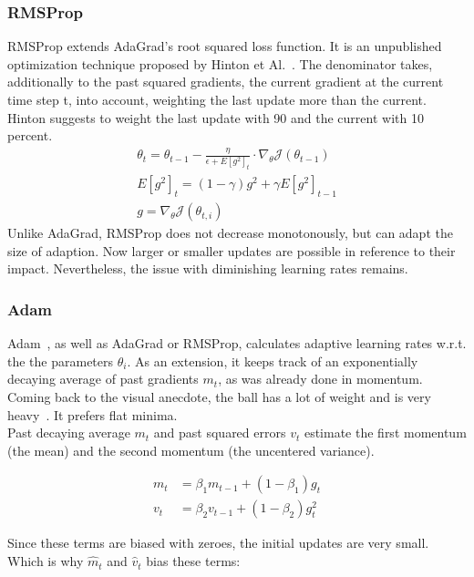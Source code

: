 \subsubsection{\gls{RMSProp}}
\gls{RMSProp} extends \gls{AdaGrad}'s root squared loss function.
It is an unpublished optimization technique proposed by Hinton et Al.~\cite{rmsprop}.
The denominator takes, additionally to the past squared gradients, the current gradient at the current time step t,
into account, weighting the last update more than the current.
Hinton suggests to weight the last update with 90 and the current with 10 percent.
\begin{align}
    \theta_{t} = \theta_{t-1} - \frac{\eta}{\epsilon+E[g^2]_t} \cdot \nabla_\theta\mathcal{J}(\theta_{t-1})\label{eqn:rmsprop:1}\\
    E[g^2]_t = (1-\gamma)g^2+\gamma E[g^2]_{t-1}\label{eqn:rmsprop:2}\\
    g = \nabla_\theta\mathcal{J}(\theta_{t,i})\label{eqn:rmsprop:3}
\end{align}
Unlike \gls{AdaGrad}, \gls{RMSProp} does not decrease monotonously, but can adapt the size of adaption.
Now larger or smaller updates are possible in reference to their impact.
Nevertheless, the issue with diminishing learning rates remains.

\subsubsection{\gls{Adam}}
\gls{Adam}~\cite{adam}, as well as \gls{AdaGrad} or \gls{RMSProp}, calculates adaptive learning rates w.r.t. the
the parameters $\theta_i$.
As an extension, it keeps track of an exponentially decaying average of past gradients $m_t$, as was already done in
momentum.\\
Coming back to the visual anecdote, the ball has a lot of weight and is very heavy~\cite{optimizersoverview}.
It prefers flat minima.\\
Past decaying average $m_t$ and past squared errors $v_t$ estimate the first momentum (the mean) and the second momentum
(the uncentered variance).

\begin{align}
    m_t &= \beta_1 m_{t-1} + (1 - \beta_1) g_t \label{eqn:adam:1}\\
    v_t &= \beta_2 v_{t-1} + (1 - \beta_2) g_t^2 \label{eqn:adam:2}
\end{align}

Since these terms are biased with zeroes, the initial updates are very small.
Which is why $\hat{m}_t$ and $\hat{v}_t$ bias these terms:

